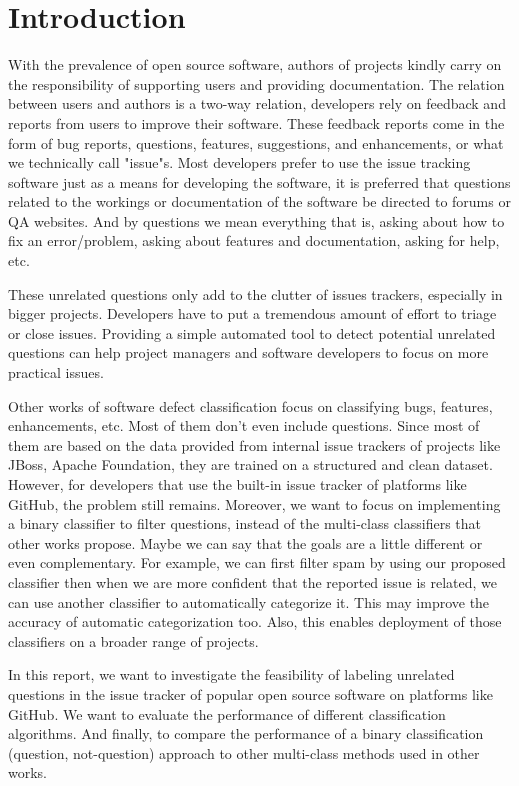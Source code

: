 \documentclass[conference]{IEEEtran}
\begin{document}
\section{Introduction}
With the prevalence of open source software, authors of projects kindly carry on 
the responsibility of supporting users and providing documentation. The relation 
between users and authors is a two-way relation, developers rely on feedback and reports from 
users to improve their software. These feedback reports come in the form of bug reports, questions, 
features, suggestions, and enhancements, or what we technically call "issue"s. Most developers
prefer to use the issue tracking software just as a means for developing the software, it is preferred 
that questions related to the workings or documentation of the software be directed to forums or QA
websites. And by questions we mean everything that is, asking about how to fix an error/problem, 
asking about features and documentation, asking for help, etc.

These unrelated questions only add to the clutter of issues trackers, especially in bigger projects.
Developers have to put a tremendous amount of effort to triage or close issues. Providing a 
simple automated tool to detect potential unrelated questions can help project managers 
and software developers to focus on more practical issues.

Other works of software defect classification focus on classifying bugs, 
features, enhancements, etc. Most of them don't even include questions. Since most of them are 
based on the data provided from internal issue trackers of projects like JBoss, Apache Foundation, they are
trained on a structured and clean dataset. However, for developers that use the built-in issue tracker
of platforms like GitHub, the problem still remains. Moreover, we want to focus on implementing 
a binary classifier to filter questions, instead of the multi-class classifiers that other 
works propose. Maybe we can say that the goals are a little different or even complementary. 
For example, we can first filter spam by using our proposed classifier then when 
we are more confident that the reported issue is related, we can use another classifier to 
automatically categorize it. This may improve the accuracy of automatic categorization too. Also, this 
enables deployment of those classifiers on a broader range of projects.

In this report, we want to investigate the feasibility of labeling unrelated questions
in the issue tracker of popular open source software on platforms like GitHub. We want to evaluate the performance
of different classification algorithms. And finally, to compare the performance of a binary classification 
(question, not-question) approach to other multi-class methods used in other works.
\end{document}
